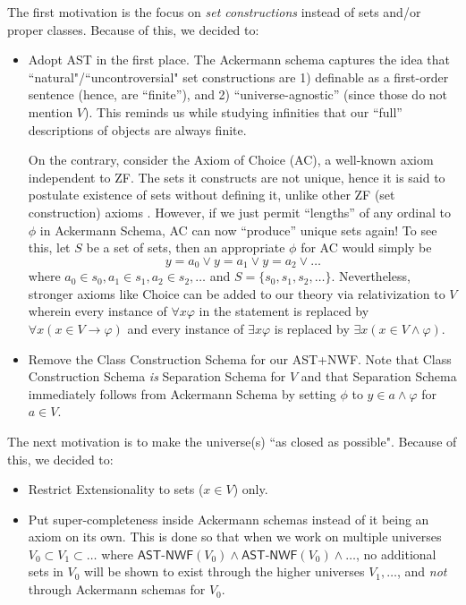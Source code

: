 \documentclass{article}
\begin{document}
The first motivation is the focus on \textit{set constructions} instead of sets and/or proper classes. Because of this, we decided to:
\begin{itemize}
\item Adopt AST in the first place. The Ackermann schema captures the idea that ``natural"/``uncontroversial" set constructions are 1) definable as a first-order sentence (hence, are ``finite''), and 2) ``universe-agnostic'' (since those do not mention $V$). This reminds us while studying infinities that our ``full'' descriptions of objects are always finite.

On the contrary, consider the Axiom of Choice (AC), a well-known axiom independent to ZF. The sets it constructs are not unique, hence it is said to postulate existence of sets without defining it, unlike other ZF (set construction) axioms \cite[Chapter 5]{jech}. However, if we just permit ``lengths'' of any ordinal to $\phi$ in Ackermann Schema, AC can now ``produce'' unique sets again! To see this, let $S$ be a set of sets, then an appropriate $\phi$ for AC would simply be $$y = a_0 \vee y = a_1 \vee y = a_2 \vee \ldots$$ where $a_0 \in s_0, a_1 \in s_1, a_2 \in s_2, \ldots$ and $S=\{s_0, s_1, s_2, \ldots\}$. Nevertheless, stronger axioms like Choice can be added to our theory via relativization to $V$ wherein every instance of $\forall x \varphi$ in the statement is replaced by $\forall x (x \in V \rightarrow \varphi)$ and every instance of $\exists x \varphi$ is replaced by $\exists x (x \in V \wedge \varphi)$.
\item Remove the Class Construction Schema for our \textsf{AST+NWF}. Note that Class Construction Schema \textit{is} Separation Schema for $V$ and that Separation Schema immediately follows from Ackermann Schema by setting $\phi$ to $y \in a \wedge \varphi$ for $a\in V$.
\end{itemize}

The next motivation is to make the universe(s) ``as closed as possible". Because of this, we decided to:
\begin{itemize}
\item Restrict Extensionality to sets ($x \in V$) only.
\item Put super-completeness inside Ackermann schemas instead of it being an axiom on its own. This is done so that when we work on multiple universes $V_0 \subset V_1 \subset \ldots$ where $ \textsf{AST-NWF}(V_0) \wedge \textsf{AST-NWF}(V_0) \wedge\ldots$, no additional sets in $V_0$ will be shown to exist through the higher universes $V_1, \ldots$, and \textit{not} through Ackermann schemas for $V_0$.
\end{itemize}
\end{document}
